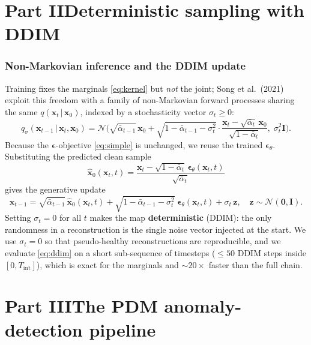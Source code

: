 \documentclass[12pt,a4paper]{article}
\newcommand{\N}{\mathcal{N}}
\newcommand{\x}{\bm{x}}
\newcommand{\z}{\bm{z}}
\newcommand{\eps}{\bm{\epsilon}}
\newcommand{\II}{\mathbf{I}}
\newcommand{\abar}{\bar{\alpha}}
\newcommand{\given}{\,\vert\,}
\begin{document}
\part*{Part II\quad Deterministic sampling with DDIM}
\label{part:ddim}

\section{Non-Markovian inference and the DDIM update}
Training fixes the marginals \eqref{eq:kernel} but \emph{not} the joint; Song et
al.\ (2021) exploit this freedom with a family of non-Markovian forward
processes sharing the same $q(\x_t\given\x_0)$, indexed by a stochasticity vector
$\sigma_t\ge0$:
\begin{equation}
q_\sigma(\x_{t-1}\given\x_t,\x_0)=\N\!\Big(\sqrt{\abar_{t-1}}\,\x_0
+\sqrt{1-\abar_{t-1}-\sigma_t^2}\cdot\frac{\x_t-\sqrt{\abar_t}\,\x_0}{\sqrt{1-\abar_t}},\;\sigma_t^2\II\Big).
\end{equation}
Because the $\eps$-objective \eqref{eq:simple} is unchanged, we reuse the trained
$\eps_\theta$. Substituting the predicted clean sample
\begin{equation}
\hat{\x}_0(\x_t,t)=\frac{\x_t-\sqrt{1-\abar_t}\,\eps_\theta(\x_t,t)}{\sqrt{\abar_t}}
\label{eq:x0hat}
\end{equation}
gives the generative update
\begin{equation}
\x_{t-1}=\sqrt{\abar_{t-1}}\,\hat{\x}_0(\x_t,t)
+\sqrt{1-\abar_{t-1}-\sigma_t^2}\;\eps_\theta(\x_t,t)+\sigma_t\,\z,\quad \z\sim\N(\bm0,\II).
\label{eq:ddim}
\end{equation}
Setting $\sigma_t=0$ for all $t$ makes the map \textbf{deterministic} (DDIM): the
only randomness in a reconstruction is the single noise vector injected at the
start. We use $\sigma_t=0$ so that pseudo-healthy reconstructions are
reproducible, and we evaluate \eqref{eq:ddim} on a short sub-sequence of
timesteps ($\le 50$ DDIM steps inside $[0,T_{\text{int}}]$), which is exact for the
marginals and $\sim\!20\times$ faster than the full chain.

\part*{Part III\quad The PDM anomaly-detection pipeline}
\label{part:pdm}
\end{document}
